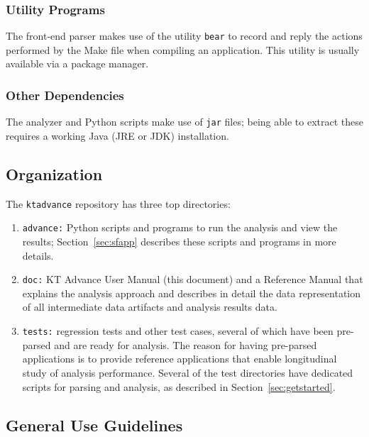 \documentclass[11pt]{article}
\begin{document}
\subsubsection{Utility Programs}
The front-end parser makes use of the utility {\tt bear} to record and reply the actions
performed by the Make file when compiling an application. This utility is usually available
via a package manager.

\subsubsection{Other Dependencies}
The analyzer and Python scripts make use of {\tt jar} files; being able to extract these 
requires a working Java (JRE or JDK) installation.

\subsection{Organization}

The {\tt ktadvance} repository has three top directories:
\begin{enumerate}
\item {\tt advance:} Python scripts and programs to run the analysis and view the results;
  Section~\ref{sec:sfapp} describes these scripts and programs in more details.
\item {\tt doc:} KT Advance User Manual (this document) and a Reference Manual that
  explains the analysis approach and describes in detail the data representation of
  all intermediate data artifacts and analysis results data.
\item {\tt tests:} regression tests and other test cases, several of which have been 
  pre-parsed and are ready for analysis. The reason for having pre-parsed applications
  is to provide reference applications that enable longitudinal study of analysis 
  performance. Several of the test directories have dedicated scripts for parsing and
  analysis, as described in Section~\ref{sec:getstarted}.
\end{enumerate}

\subsection{General Use Guidelines}
\end{document}
